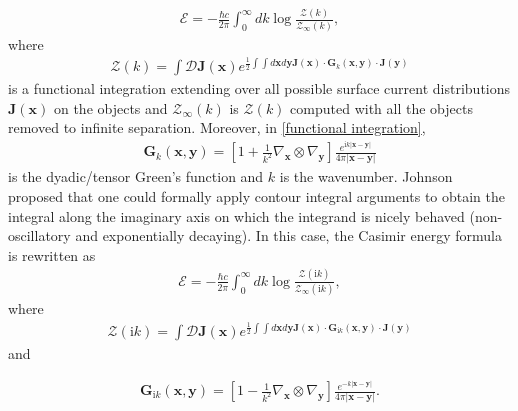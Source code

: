 \begin{align*}
    \mathcal{E} = -\frac{\hbar c}{2\pi}\int_{0}^{\infty}dk\log\frac{\mathcal{Z}(k)}{\mathcal{Z}_{\infty}(k)},
\end{align*}
where 
\begin{align}\label{functional integration}
    \mathcal{Z}(k) = \int \mathcal{D}\boldsymbol{J}(\boldsymbol{x})e^{\frac{1}{2}\int\int d\boldsymbol{x}d\boldsymbol{y}\boldsymbol{J}(\boldsymbol{x}) \cdot \boldsymbol{G}_{k}(\boldsymbol{x}, \boldsymbol{y}) \cdot \boldsymbol{J}(\boldsymbol{y})}
\end{align}
is a functional integration extending over all possible surface current distributions $\boldsymbol{J}(\boldsymbol{x})$ on the objects and 
$\mathcal{Z}_{\infty}(k)$ is $\mathcal{Z}(k)$ computed with all the objects removed to infinite separation. Moreover, in \eqref{functional integration},
\begin{align*}
    \boldsymbol{G}_{k}(\boldsymbol{x}, \boldsymbol{y}) = \left[1 + \frac{1}{k^{2}}\nabla_{\boldsymbol{x}}\otimes\nabla_{\boldsymbol{y}}\right]\frac{e^{\mathrm{i}k|\boldsymbol{x} - \boldsymbol{y}|}}{4\pi|\boldsymbol{x} - \boldsymbol{y}|}
\end{align*}
is the dyadic/tensor Green's function and $k$ is the wavenumber. Johnson proposed that one could formally apply contour integral arguments to obtain the integral 
along the imaginary axis on which the integrand is nicely behaved (non-oscillatory and exponentially decaying). In this case, the Casimir energy formula 
is rewritten as 
\begin{align}\label{rotated CasE}
    \mathcal{E} = -\frac{\hbar c}{2\pi}\int_{0}^{\infty}dk\log\frac{\mathcal{Z}(\mathrm{i}k)}{\mathcal{Z}_{\infty}(\mathrm{i}k)},
\end{align}
where 
\begin{align}
    \mathcal{Z}(\mathrm{i}k) = \int \mathcal{D}\boldsymbol{J}(\boldsymbol{x})e^{\frac{1}{2}\int\int d\boldsymbol{x}d\boldsymbol{y}\boldsymbol{J}(\boldsymbol{x}) \cdot \boldsymbol{G}_{\mathrm{i}k}(\boldsymbol{x}, \boldsymbol{y}) \cdot \boldsymbol{J}(\boldsymbol{y})}
\end{align}
and 

\begin{align*}
    \boldsymbol{G}_{\mathrm{i}k}(\boldsymbol{x}, \boldsymbol{y}) = \left[1 - \frac{1}{k^{2}}\nabla_{\boldsymbol{x}}\otimes\nabla_{\boldsymbol{y}}\right]\frac{e^{-k|\boldsymbol{x} - \boldsymbol{y}|}}{4\pi|\boldsymbol{x} - \boldsymbol{y}|}.
\end{align*}

